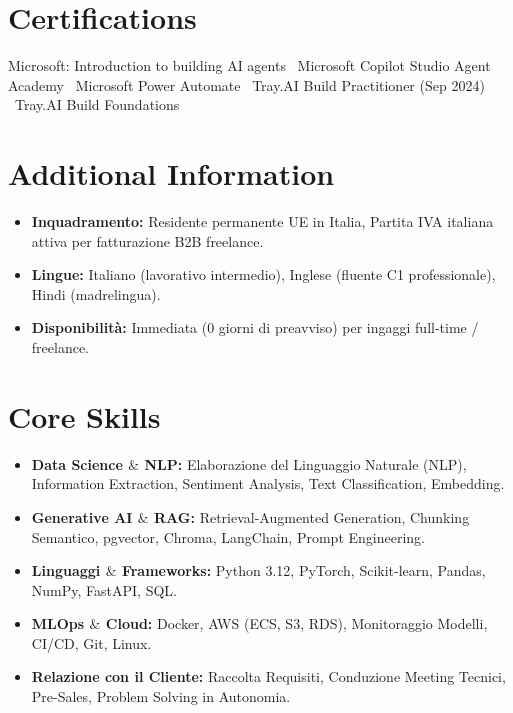 \documentclass[a4paper,10pt]{article}
\begin{document}
\section{Certifications}
Microsoft: Introduction to building AI agents \textbullet\ Microsoft Copilot Studio Agent Academy \textbullet\ Microsoft Power Automate \textbullet\ Tray.AI Build Practitioner (Sep 2024) \textbullet\ Tray.AI Build Foundations

\section{Additional Information}
\begin{itemize}
  \item \textbf{Inquadramento:} Residente permanente UE in Italia, Partita IVA italiana attiva per fatturazione B2B freelance.
  \item \textbf{Lingue:} Italiano (lavorativo intermedio), Inglese (fluente C1 professionale), Hindi (madrelingua).
  \item \textbf{Disponibilità:} Immediata (0 giorni di preavviso) per ingaggi full-time / freelance.
\end{itemize}

\section{Core Skills}
\begin{itemize}
  \item \textbf{Data Science $\&$ NLP:} Elaborazione del Linguaggio Naturale (NLP), Information Extraction, Sentiment Analysis, Text Classification, Embedding.
  \item \textbf{Generative AI $\&$ RAG:} Retrieval-Augmented Generation, Chunking Semantico, pgvector, Chroma, LangChain, Prompt Engineering.
  \item \textbf{Linguaggi $\&$ Frameworks:} Python 3.12, PyTorch, Scikit-learn, Pandas, NumPy, FastAPI, SQL.
  \item \textbf{MLOps $\&$ Cloud:} Docker, AWS (ECS, S3, RDS), Monitoraggio Modelli, CI/CD, Git, Linux.
  \item \textbf{Relazione con il Cliente:} Raccolta Requisiti, Conduzione Meeting Tecnici, Pre-Sales, Problem Solving in Autonomia.
\end{itemize}
\end{document}
